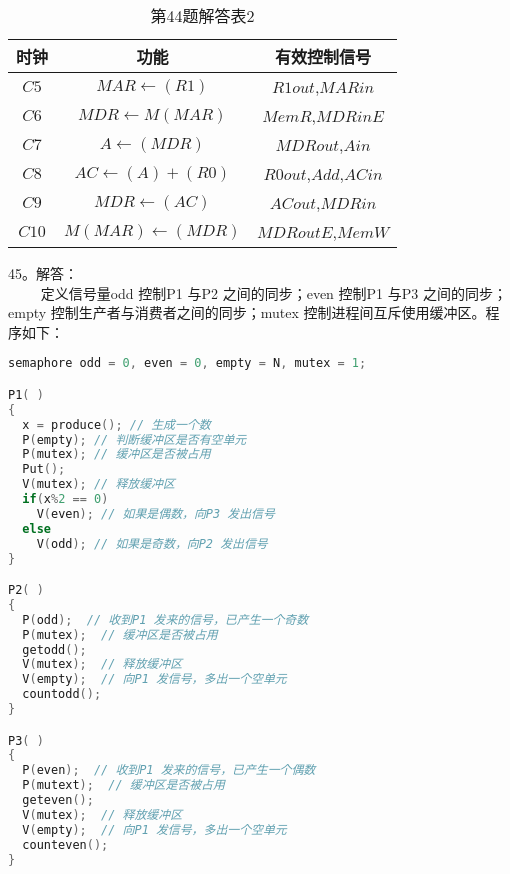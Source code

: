\begin{table}[ht]
\centering
\caption{第44题解答表2}\label{tab_CSN09_7}
\begin{tabular}{|c|c|c|}
\hline
时钟 & 功能 & 有效控制信号 \\
\hline
$C5$ & $MAR\leftarrow(R1)$ & $R1out$,$MARin$ \\
\hline
$C6$ & $MDR\leftarrow M(MAR)$ & $MemR$,$MDRinE$ \\
\hline
$C7$ & $A\leftarrow(MDR)$ & $MDRout$,$Ain$ \\
\hline
$C8$ & $AC\leftarrow(A)+(R0)$ & $R0out$,$Add$,$ACin$ \\
\hline
$C9$ & $MDR\leftarrow(AC)$ & $ACout$,$MDRin$ \\
\hline
$C10$ & $M(MAR)\leftarrow(MDR)$ & $MDRoutE$,$MemW$ \\
\hline
\end{tabular}
\end{table}

45。解答： \\
$\qquad$ 定义信号量odd 控制P1 与P2 之间的同步；even 控制P1 与P3 之间的同步；empty 控制生产者与消费者之间的同步；mutex 控制进程间互斥使用缓冲区。程序如下：
\begin{lstlisting}[language=cpp]
semaphore odd = 0, even = 0, empty = N, mutex = 1;

P1( )
{
  x = produce(); // 生成一个数
  P(empty); // 判断缓冲区是否有空单元
  P(mutex); // 缓冲区是否被占用
  Put();
  V(mutex); // 释放缓冲区
  if(x%2 == 0)
    V(even); // 如果是偶数，向P3 发出信号
  else
    V(odd); // 如果是奇数，向P2 发出信号
}

P2( )
{
  P(odd);  // 收到P1 发来的信号，已产生一个奇数
  P(mutex);  // 缓冲区是否被占用
  getodd();
  V(mutex);  // 释放缓冲区
  V(empty);  // 向P1 发信号，多出一个空单元
  countodd();
}

P3( )
{
  P(even);  // 收到P1 发来的信号，已产生一个偶数
  P(mutext);  // 缓冲区是否被占用
  geteven();
  V(mutex);  // 释放缓冲区
  V(empty);  // 向P1 发信号，多出一个空单元
  counteven();
}
\end{lstlisting}

